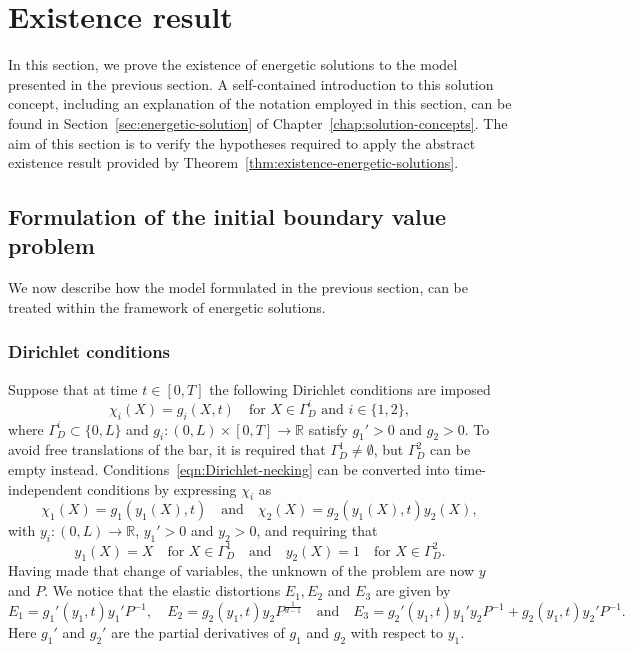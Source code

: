 \documentclass[a4paper,10pt,twoside]{amsbook}
\numberwithin{section}{chapter}
\numberwithin{equation}{chapter}
\theoremstyle{definition}
\begin{document}
\section{Existence result}
\label{sec:existence-necking}

In this section, we prove the existence of energetic solutions to the model presented in the previous section. A self-contained introduction to this solution concept, including an explanation of the notation employed in this section, can be found in Section~\ref{sec:energetic-solution} of Chapter~\ref{chap:solution-concepts}. The aim of this section is to verify the hypotheses required to apply the abstract existence result provided by Theorem~\ref{thm:existence-energetic-solutions}.

\subsection{Formulation of the initial boundary value problem}
\label{subsec:formulation-bvp-neck}

We now describe how the model formulated in the previous section, can be treated within the framework of energetic solutions.

\subsubsection*{Dirichlet conditions}

Suppose that at time $t\in[0,T]$ the following Dirichlet conditions are imposed
\begin{equation}
\label{eqn:Dirichlet-necking}
\chi_i(X)=g_i(X,t)\quad\text{for $X\in\Gamma_D^i$ and $i\in\{1,2\}$},
\end{equation}
where $\Gamma_D^i\subset\{0,L\}$ and $g_i\colon(0,L)\times[0,T]\to\mathbb{R}$ satisfy $g_1'>0$ and $g_2>0$. To avoid free translations of the bar, it is required that $\Gamma_D^1\neq\emptyset$, but $\Gamma_D^2$ can be empty instead. Conditions~\eqref{eqn:Dirichlet-necking} can be converted into time-independent conditions by expressing $\chi_i$ as
\[
\chi_1(X)=g_1(y_1(X),t)\quad\text{and}\quad\chi_2(X)=g_2(y_1(X),t)y_2(X),
\]
with $y_i\colon(0,L)\to\mathbb{R}$, $y_1'>0$ and $y_2>0$, and requiring that
\[
y_1(X)=X\quad\text{for $X\in\Gamma_D^1$}\quad\text{and}\quad y_2(X)=1\quad\text{for $X\in\Gamma_D^2$}.
\]
Having made that change of variables, the unknown of the problem are now $y$ and $P$. We notice that the elastic distortions $E_1,E_2$ and $E_3$ are given by
\[
E_1=g_1'(y_1,t)y_1'P^{-1},\quad E_2=g_2(y_1,t)y_2P^{\frac{1}{d-1}}\quad\text{and}\quad E_3=g_2'(y_1,t)y_1'y_2P^{-1}+g_2(y_1,t)y_2'P^{-1}.
\]
Here $g_1'$ and $g_2'$ are the partial derivatives of $g_1$ and $g_2$ with respect to $y_1$.
\end{document}
